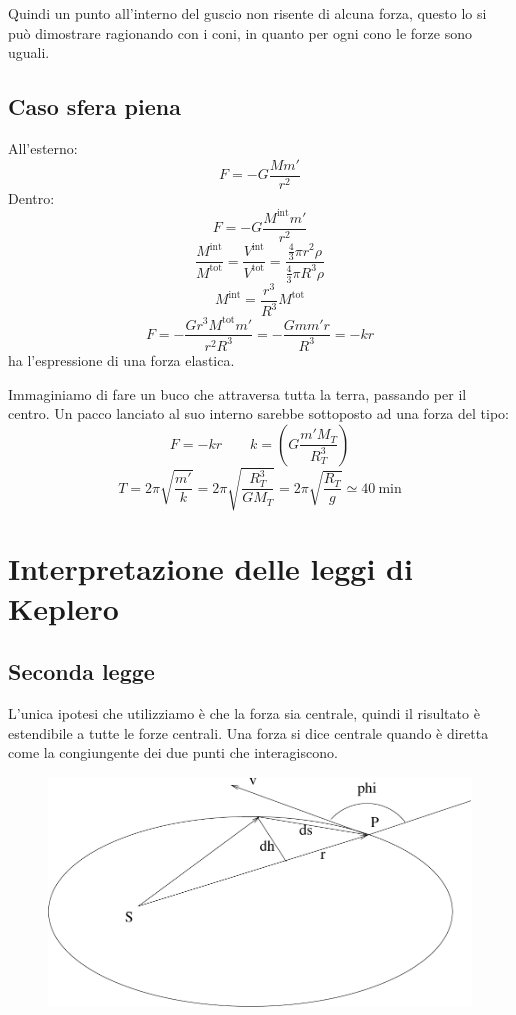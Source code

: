 Quindi un punto all'interno del guscio non risente di alcuna
forza, questo lo si può dimostrare ragionando con i coni, in
quanto per ogni cono le forze sono uguali.
\subsection{Caso sfera piena}
All'esterno:
\[F=-G\frac{Mm'}{r^2}\]
Dentro:
\[F=-G\frac{M^{\text{int}}m'}{r^2}\]
\[\frac{M^{\text{int}}}{M^{\text{tot}}}=\frac{V^{\text{int}}}{V^{\text{tot}}}=\frac{\frac{4}{3}\pi r^2\rho}{\frac{4}{3}\pi R^3\rho}\]
\[M^{\text{int}}=\frac{r^3}{R^3}M^{\text{tot}}\]
\[F=-\frac{Gr^3M^{\text{tot}}m'}{r^2R^3}=-\frac{Gmm'r}{R^3}=-kr\]
ha l'espressione di una forza elastica.

\begin{Es}
Immaginiamo di fare un buco che attraversa tutta la terra, passando per il centro. Un pacco lanciato al suo interno sarebbe sottoposto ad una forza del tipo:
\[F=-kr\qquad k=\left(G\frac{m'M_T}{R_T^3}\right)\]
\[T=2\pi\sqrt{\frac{m'}{k}}=2\pi\sqrt{\frac{R_T^3}{GM_T}}=2\pi\sqrt{\frac{R_T}{g}}\simeq \SI{40}{\minute} \]
\end{Es}
\section{Interpretazione delle leggi di Keplero}
\subsection{Seconda legge}

L'unica ipotesi che utilizziamo è che la forza sia centrale,
quindi il risultato è estendibile a tutte le forze centrali. Una
forza si dice centrale quando è diretta come la congiungente dei
due punti che interagiscono.

\begin{figure}[htbp]
   \centering
   \includegraphics[scale=0.45]{immagini/fisica1/keplero}
\end{figure}



